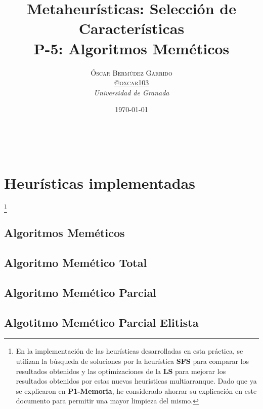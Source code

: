 \documentclass[a4paper, 11pt]{article}
\title{\textbf{Metaheurísticas: Selección de Características}\\ %
P-5: Algoritmos Meméticos} %
\author{\textsc{Óscar Bermúdez Garrido\\
\href{http://www.github.com/oxcar103}{@oxcar103}} %
\\{\textit{Universidad de Granada}}} %
\date{\today} %
\makeatletter
\renewcommand{\maketitle}{
  \begin{flushright} %
  {\LARGE\@title} %
  
  \vspace{50pt} %
  
  {\large\@author} %
  \\\@date %
  \vspace{40pt} %
  \end{flushright}
}
\makeatother
\begin{document}
\maketitle %

\renewcommand{\abstractname}{Resumen} %



{\parskip=2pt
  \tableofcontents
}
\pagebreak

	
	
	
	\section{Heurísticas implementadas}\footnote{En la implementación de las heurísticas desarrolladas
	en esta práctica, se utilizan la búsqueda de soluciones por la heurística \textbf{SFS} para comparar
	los resultados obtenidos y las optimizaciones de la \textbf{LS} para mejorar los resultados obtenidos
	por estas nuevas heurísticas multiarranque. Dado que ya se explicaron en \textbf{P1-Memoria}, he
	considerado ahorrar su explicación en este documento para permitir una mayor limpieza del mismo.}
	
		\subsection{Algoritmos Meméticos}
		\subsection{Algoritmo Memético Total}
		\subsection{Algoritmo Memético Parcial}
		\subsection{Algotitmo Memético Parcial Elitista}
	
\end{document}

